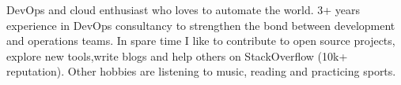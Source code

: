 

\begin{cvparagraph}

DevOps and cloud enthusiast who loves to automate the world. 3+ years experience in DevOps consultancy to strengthen the bond between development and operations teams. 
In spare time I like to contribute to open source projects, explore new tools,write blogs and help others on StackOverflow (10k+ reputation). 
Other hobbies are listening to music, reading and practicing sports.

\end{cvparagraph}
